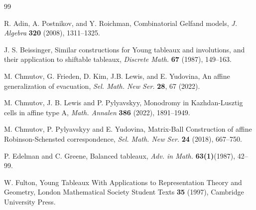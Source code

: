 \documentclass[11pt]{article}
\begin{document}
 \begin{thebibliography}{99}

 R. Adin, A. Postnikov, and Y. Roichman, Combinatorial Gelfand models, \emph{J. Algebra} \textbf{320} (2008), 1311--1325. 
 
 J. S. Beissinger, Similar constructions for Young tableaux and involutions, and their application to shiftable tableaux, \emph{Discrete Math.} \textbf{67} (1987), 149--163.

 M. Chmutov, G. Frieden, D. Kim, J.B. Lewis, and E. Yudovina, An affine generalization of evacuation, \emph{Sel. Math. New Ser.} \textbf{28}, 67 (2022).

 M. Chmutov, J. B. Lewis and P. Pylyavskyy, Monodromy in Kazhdan-Lusztig cells in affine type A, \emph{Math. Annalen} \textbf{386} (2022), 1891--1949.

 M. Chmutov, P. Pylyavskyy and E. Yudovina, Matrix-Ball Construction of affine Robinson-Schensted correspondence, \emph{Sel. Math. New Ser.} \textbf{24} (2018), 667--750.


 P. Edelman and C. Greene, Balanced tableaux, \emph{Adv. in Math.} \textbf{63(1)}(1987), 42--99.

 W. Fulton, Young Tableaux With Applications to Representation Theory and Geometry, London Mathematical Society Student Texts \textbf{35} (1997), Cambridge University Press.






%



\end{thebibliography}
\end{document}
